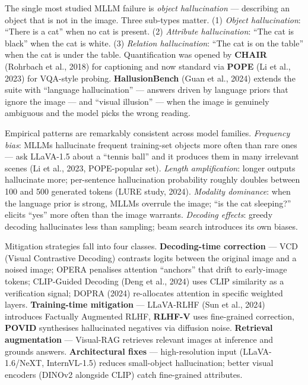 The single most studied MLLM failure is \emph{object hallucination} --- describing an object that is not in the image. Three sub-types matter. (1) \emph{Object hallucination}: ``There is a cat'' when no cat is present. (2) \emph{Attribute hallucination}: ``The cat is black'' when the cat is white. (3) \emph{Relation hallucination}: ``The cat is on the table'' when the cat is under the table. Quantification was opened by \textbf{CHAIR} (Rohrbach et al., 2018) for captioning and now standard via \textbf{POPE} (Li et al., 2023) for VQA-style probing. \textbf{HallusionBench} (Guan et al., 2024) extends the suite with ``language hallucination'' --- answers driven by language priors that ignore the image --- and ``visual illusion'' --- when the image is genuinely ambiguous and the model picks the wrong reading.

Empirical patterns are remarkably consistent across model families. \emph{Frequency bias}: MLLMs hallucinate frequent training-set objects more often than rare ones --- ask LLaVA-1.5 about a ``tennis ball'' and it produces them in many irrelevant scenes (Li et al., 2023, POPE-popular set). \emph{Length amplification}: longer outputs hallucinate more; per-sentence hallucination probability roughly doubles between 100 and 500 generated tokens (LURE study, 2024). \emph{Modality dominance}: when the language prior is strong, MLLMs overrule the image; ``is the cat sleeping?'' elicits ``yes'' more often than the image warrants. \emph{Decoding effects}: greedy decoding hallucinates less than sampling; beam search introduces its own biases.

Mitigation strategies fall into four classes. \textbf{Decoding-time correction} --- VCD (Visual Contrastive Decoding) contrasts logits between the original image and a noised image; OPERA penalises attention ``anchors'' that drift to early-image tokens; CLIP-Guided Decoding (Deng et al., 2024) uses CLIP similarity as a verification signal; DOPRA (2024) re-allocates attention in specific weighted layers. \textbf{Training-time mitigation} --- LLaVA-RLHF (Sun et al., 2024) introduces Factually Augmented RLHF, \textbf{RLHF-V} uses fine-grained correction, \textbf{POVID} synthesises hallucinated negatives via diffusion noise. \textbf{Retrieval augmentation} --- Visual-RAG retrieves relevant images at inference and grounds answers. \textbf{Architectural fixes} --- high-resolution input (LLaVA-1.6/NeXT, InternVL-1.5) reduces small-object hallucination; better visual encoders (DINOv2 alongside CLIP) catch fine-grained attributes.

